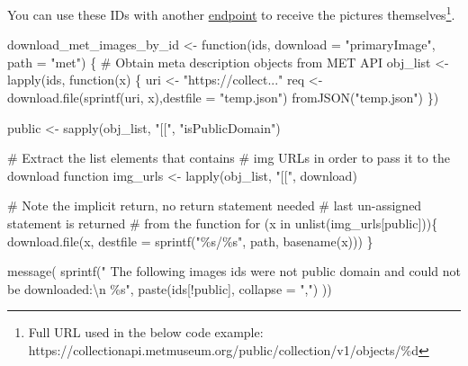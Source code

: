 \documentclass[
  12pt,
  letterpaper,
]{krantz}
\newenvironment{Shaded}{\begin{snugshade}}{\end{snugshade}}
\newcommand{\AttributeTok}[1]{\textcolor[rgb]{0.40,0.45,0.13}{#1}}
\newcommand{\CommentTok}[1]{\textcolor[rgb]{0.37,0.37,0.37}{#1}}
\newcommand{\ControlFlowTok}[1]{\textcolor[rgb]{0.00,0.23,0.31}{#1}}
\newcommand{\FunctionTok}[1]{\textcolor[rgb]{0.28,0.35,0.67}{#1}}
\newcommand{\NormalTok}[1]{\textcolor[rgb]{0.00,0.23,0.31}{#1}}
\newcommand{\OtherTok}[1]{\textcolor[rgb]{0.00,0.23,0.31}{#1}}
\newcommand{\SpecialCharTok}[1]{\textcolor[rgb]{0.37,0.37,0.37}{#1}}
\newcommand{\StringTok}[1]{\textcolor[rgb]{0.13,0.47,0.30}{#1}}
\begin{document}
You can use these IDs with another \href{glossary.qmd}{endpoint} to
receive the pictures themselves\footnote{Full URL used in the below code
  example:
  https://collectionapi.metmuseum.org/public/collection/v1/objects/\%d}.

\begin{Shaded}
\begin{Highlighting}[]
\NormalTok{download\_met\_images\_by\_id }\OtherTok{\textless{}{-}} 
  \ControlFlowTok{function}\NormalTok{(ids,}
           \AttributeTok{download =} \StringTok{"primaryImage"}\NormalTok{,}
           \AttributeTok{path =} \StringTok{"met"}\NormalTok{) \{}
  \CommentTok{\# Obtain meta description objects from MET API}
\NormalTok{  obj\_list }\OtherTok{\textless{}{-}} \FunctionTok{lapply}\NormalTok{(ids, }\ControlFlowTok{function}\NormalTok{(x) \{}
\NormalTok{    uri }\OtherTok{\textless{}{-}} \StringTok{"https://collect..."}
\NormalTok{    req }\OtherTok{\textless{}{-}} \FunctionTok{download.file}\NormalTok{(}\FunctionTok{sprintf}\NormalTok{(uri,}
\NormalTok{    x),}\AttributeTok{destfile =} \StringTok{"temp.json"}\NormalTok{)}
    \FunctionTok{fromJSON}\NormalTok{(}\StringTok{"temp.json"}\NormalTok{)}
\NormalTok{  \})}
  
  
\NormalTok{  public }\OtherTok{\textless{}{-}} \FunctionTok{sapply}\NormalTok{(obj\_list, }\StringTok{"[["}\NormalTok{, }\StringTok{"isPublicDomain"}\NormalTok{)}
  
  
  \CommentTok{\# Extract the list elements that contains}
  \CommentTok{\# img URLs in order to pass it to the download function}
\NormalTok{  img\_urls }\OtherTok{\textless{}{-}} \FunctionTok{lapply}\NormalTok{(obj\_list, }\StringTok{"[["}\NormalTok{, download)}
  
  \CommentTok{\# Note the implicit return, no return statement needed}
  \CommentTok{\# last un{-}assigned statement is returned}
  \CommentTok{\# from the function}
  \ControlFlowTok{for}\NormalTok{ (x }\ControlFlowTok{in} \FunctionTok{unlist}\NormalTok{(img\_urls[public]))\{}
    \FunctionTok{download.file}\NormalTok{(x, }\AttributeTok{destfile =} \FunctionTok{sprintf}\NormalTok{(}\StringTok{"\%s/\%s"}\NormalTok{,}
\NormalTok{     path, }\FunctionTok{basename}\NormalTok{(x)))}
\NormalTok{  \}}
  
  
  \FunctionTok{message}\NormalTok{(}
    \FunctionTok{sprintf}\NormalTok{(}\StringTok{"}
\StringTok{    The following images ids were not public}
\StringTok{    domain and could not be downloaded:}\SpecialCharTok{\textbackslash{}n}\StringTok{ \%s"}\NormalTok{,}
            \FunctionTok{paste}\NormalTok{(ids[}\SpecialCharTok{!}\NormalTok{public], }\AttributeTok{collapse =} \StringTok{","}\NormalTok{)}
\NormalTok{  ))}
  

\end{Highlighting}
\end{Shaded}
\end{document}
